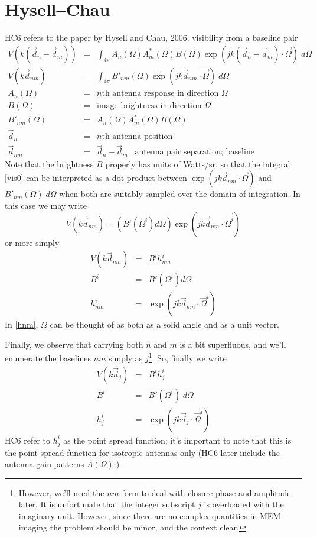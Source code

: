 \documentclass[12pt]{book}
\begin{document}
\chapter{Hysell--Chau}
HC6 refers to the paper by Hysell and Chau, 2006\cite{hysell2006optimal}.
visibility from a baseline pair
\begin{eqnarray}
V(k(\vec{d}_n - \vec{d}_m)) &=& \int_{4\pi} A_n(\Omega) A^\ast_m(\Omega) B(\Omega) \exp(j k (\vec{d}_n - \vec{d}_m)\cdot \vec{\Omega}) \; d\Omega \\		
V(k\vec{d}_{nm}) &=& \int_{4\pi} B'_{nm}(\Omega) \exp(j k \vec{d}_{nm} \cdot \vec{\Omega}) \; d\Omega \label{e:vis0} \\
A_n(\Omega)      &=& n\textrm{th antenna response in direction } \Omega \\
B(\Omega)           &=& \textrm{image brightness in direction } \Omega \\
B'_{nm}(\Omega) &=& A_n(\Omega)A^\ast_m(\Omega) B(\Omega) \\
\vec{d}_n             &=& n\textrm{th antenna position} \\
\vec{d}_{nm}        &=&  \vec{d}_n - \vec{d}_m \;\;\; \textrm{antenna pair separation; baseline}
\end{eqnarray}
Note that the brightness $B$ properly has units of Watts/sr, so that the integral \eqref{vis0} can be interpreted as a dot 
product between $\exp(j k \vec{d}_{nm} \cdot \vec{\Omega})$ and $B'_{nm}(\Omega) \; d\Omega$ when both are
suitably sampled over the domain of integration.  In this case we may write
\begin{equation}
V(k\vec{d}_{nm}) = (B'(\Omega^i)d\Omega)\exp(j k \vec{d}_{nm} \cdot \vec{\Omega^i})  
\end{equation}
or more simply
\begin{eqnarray}
V(k\vec{d}_{nm}) &=& B^i h^i_{nm} \\
B^i       &=& B'(\Omega^i) d\Omega \\
h^i_{nm} &=&\exp(j k \vec{d}_{nm} \cdot \vec{\Omega}^i) \label{e:hnm}
\end{eqnarray}
In \eqref{hnm}, $\Omega$ can be thought of as both as a solid angle and as a unit vector.

Finally, we observe that carrying both $n$ and $m$ is a bit superfluous, and we'll enumerate the baselines $nm$ 
simply as $j$\footnote{However, we'll need the $nm$ form to deal with closure phase and amplitude later.  It is 
unfortunate that the integer subscript $j$ is overloaded with the imaginary unit.  However, since there are no 
complex quantities in MEM imaging the problem should be minor, and the context clear.}.
So, finally we write
\begin{eqnarray}
V(k\vec{d}_j) &=& B^i h^i_j \\
B^i       &=& B'(\Omega^i) \; d\Omega \\
h^i_j    &=&\exp(j k \vec{d}_j \cdot \vec{\Omega}^i)
\end{eqnarray}
HC6 refer to $h^i_j$ as the point spread function; it's important to note that this is the point spread function for
isotropic antennas only (HC6 later include the antenna gain patterns $A(\Omega)$.)
\end{document}
